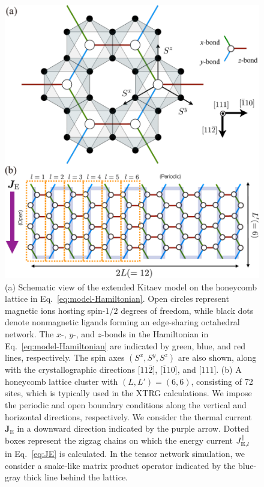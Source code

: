 \documentclass[twocolumn,superscriptaddress,showpacs, longbibliography, aps, prx]{revtex4-2}
\begin{document}
\begin{figure}[tbh]
  \begin{center}
    \includegraphics[width=\linewidth]{Figs/lattice_ver3.pdf}    
  \end{center}
  \caption{
  (a) Schematic view of the extended Kitaev model on the honeycomb lattice in Eq.~\eqref{eq:model-Hamiltonian}. Open circles represent magnetic ions hosting spin-$1/2$ degrees of freedom, while black dots denote nonmagnetic ligands forming an edge-sharing octahedral network.
  The $x$-, $y$-, and $z$-bonds in the Hamiltonian in Eq.~\eqref{eq:model-Hamiltonian} are indicated by green, blue, and red lines, respectively. 
  The spin axes $(S^x, S^y, S^z)$ are also shown, along with the crystallographic directions [$11\bar{2}$], [$\bar{1}10$], and [$111$]. 
  (b) A honeycomb lattice cluster with  $(L, L') = (6, 6) $, consisting of 72 sites, which is typically used in the XTRG calculations. 
  We impose the periodic and open boundary conditions along the vertical and horizontal directions, respectively. 
  We consider the thermal current $\bm{J}_{\mathrm{E}}$ in a downward direction indicated by the purple arrow. 
  Dotted boxes represent the zigzag chains on which the energy current $J_{{\rm E},l}^\parallel$ in Eq.~\eqref{eq:JE} is calculated. 
  In the tensor network simulation, we consider a snake-like matrix product operator indicated by the blue-gray thick line behind the lattice.
  }
  \label{fig:lattice}
\end{figure}
\end{document}
